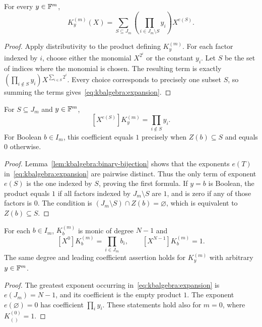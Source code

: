 \begin{lemma}\label{lem:kbalgebra:product-expansion}
For every $y\in\mathbb{F}^m$,
\begin{equation}\label{eq:kbalgebra:expansion}
 K_y^{(m)}(X)=\sum_{S\subseteq J_m}\left(\prod_{i\in J_m\setminus S}y_i\right)X^{e(S)}.
\end{equation}
\end{lemma}
\begin{proof}
Apply distributivity to the product defining $K_y^{(m)}$. For each factor indexed by $i$, choose either the monomial $X^{2^i}$ or the constant $y_i$. Let $S$ be the set of indices where the monomial is chosen. The resulting term is exactly $\left(\prod_{i\notin S}y_i\right)X^{\sum_{i\in S}2^i}$. Every choice corresponds to precisely one subset $S$, so summing the terms gives~\eqref{eq:kbalgebra:expansion}.
\end{proof}

\begin{lemma}\label{lem:kbalgebra:coefficient-rule}
For $S\subseteq J_m$ and $y\in\mathbb{F}^m$,
\[
 [X^{e(S)}]K_y^{(m)}=\prod_{i\notin S}y_i.
\]
For Boolean $b\in I_m$, this coefficient equals $1$ precisely when $Z(b)\subseteq S$ and equals $0$ otherwise.
\end{lemma}
\begin{proof}
Lemma~\ref{lem:kbalgebra:binary-bijection} shows that the exponents $e(T)$ in~\eqref{eq:kbalgebra:expansion} are pairwise distinct. Thus the only term of exponent $e(S)$ is the one indexed by $S$, proving the first formula. If $y=b$ is Boolean, the product equals $1$ if all factors indexed by $J_m\setminus S$ are $1$, and is zero if any of those factors is $0$. The condition is $(J_m\setminus S)\cap Z(b)=\varnothing$, which is equivalent to $Z(b)\subseteq S$.
\end{proof}

\begin{corollary}\label{cor:kbalgebra:monic}
For each $b\in I_m$, $K_b^{(m)}$ is monic of degree $N-1$ and
\[
 [X^0]K_b^{(m)}=\prod_{i\in J_m}b_i,
 \qquad [X^{N-1}]K_b^{(m)}=1.
\]
The same degree and leading coefficient assertion holds for $K_y^{(m)}$ with arbitrary $y\in\mathbb{F}^m$.
\end{corollary}
\begin{proof}
The greatest exponent occurring in~\eqref{eq:kbalgebra:expansion} is $e(J_m)=N-1$, and its coefficient is the empty product $1$. The exponent $e(\varnothing)=0$ has coefficient $\prod_iy_i$. These statements hold also for $m=0$, where $K_{()}^{(0)}=1$.
\end{proof}

